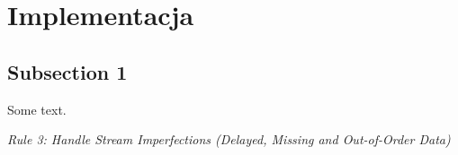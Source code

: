 \section{Implementacja}
\subsection{Subsection 1}

Some text.

\emph{Rule 3: Handle Stream Imperfections (Delayed, Missing and Out-of-Order Data)} \cite{stream-processing-streamsql}
